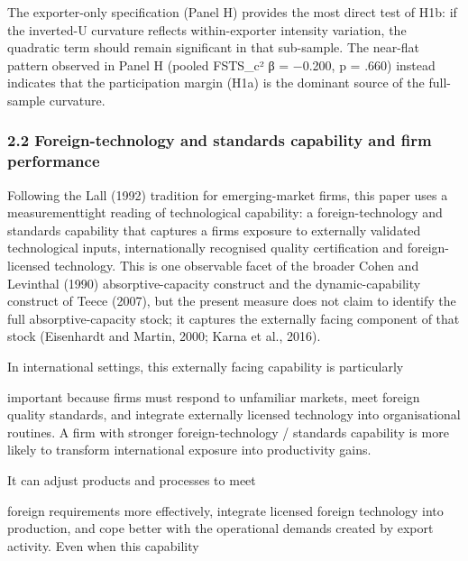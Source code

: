 \documentclass[12pt,a4paper]{article}
\begin{document}
The exporter-only specification (Panel H) provides the most direct test
of H1b: if the inverted-U curvature reflects within-exporter intensity
variation, the quadratic term should remain significant in that
sub-sample. The near-flat pattern observed in Panel H (pooled FSTS\_c² β
= −0.200, p = .660) instead indicates that the participation margin
(H1a) is the dominant source of the full-sample curvature.

\hypertarget{22-foreign-technology-and-standards-capability-and-firm-performance}{%
\subsubsection{2.2 Foreign-technology and standards capability and firm
performance}\label{22-foreign-technology-and-standards-capability-and-firm-performance}}

Following the Lall (1992) tradition for emerging-market firms, this
paper uses a measurementtight reading of technological capability: a
foreign-technology and standards capability that captures a
firm\textquotesingle s exposure to externally validated technological
inputs, internationally recognised quality certification and
foreign-licensed technology. This is one observable facet of the broader
Cohen and Levinthal (1990) absorptive-capacity construct and the
dynamic-capability construct of Teece (2007), but the present measure
does not claim to identify the full absorptive-capacity stock; it
captures the externally facing component of that stock (Eisenhardt and
Martin, 2000; Karna et al., 2016).

In international settings, this externally facing capability is
particularly

important because firms must respond to unfamiliar markets, meet foreign
quality standards, and integrate externally licensed technology into
organisational routines. A firm with stronger foreign-technology /
standards capability is more likely to transform international exposure
into productivity gains.

It can adjust products and processes to meet

foreign requirements more effectively, integrate licensed foreign
technology into production, and cope better with the operational demands
created by export activity. Even when this capability
\end{document}

